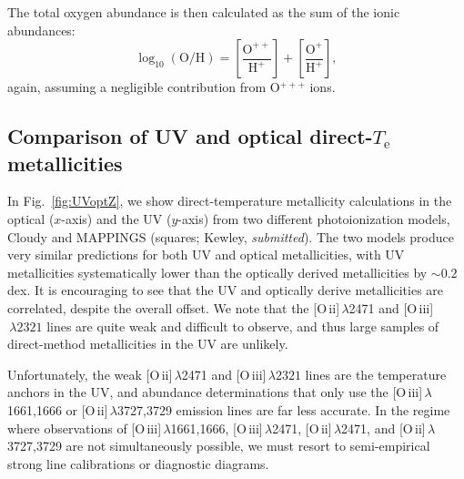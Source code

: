 \documentclass[preprint2]{aastex62}
\newcommand{\oiii}{[O\,{\sc iii}]\xspace}
\newcommand{\oii}{[O\,{\sc ii}]\xspace}
\newcommand{\Te}{\ensuremath{T_{\mathrm{e}}}\xspace}
\begin{document}
The total oxygen abundance is then calculated as the sum of the ionic abundances:
\begin{equation}
    \log_{10}(\mathrm{O}/\mathrm{H}) = \left[ \frac{\mathrm{O}^{++}}{\mathrm{H}^{+}} \right] + \left[ \frac{\mathrm{O}^{+}}{\mathrm{H}^{+}} \right],
\end{equation}
again, assuming a negligible contribution from O$^{+++}$ ions.

\subsection{Comparison of UV and optical direct-\Te metallicities}

In Fig.~\ref{fig:UVoptZ}, we show direct-temperature metallicity calculations in the optical ($x$-axis) and the UV ($y$-axis) from two different photoionization models, Cloudy \citep[circles;][]{Byler+2018} and MAPPINGS (squares; Kewley, \emph{submitted}). The two models produce very similar predictions for both UV and optical metallicities, with UV metallicities systematically lower than the optically derived metallicities by $\sim0.2$\,dex. It is encouraging to see that the UV and optically derive metallicities are correlated, despite the overall offset. We note that the \oii$\,\lambda$2471 and \oiii$\,\lambda2321$ lines are quite weak and difficult to observe, and thus large samples of direct-method metallicities in the UV are unlikely.

Unfortunately, the weak \oii$\,\lambda$2471 and \oiii$\,\lambda2321$ lines are the temperature anchors in the UV, and abundance determinations that only use the \oiii$\,\lambda$1661,1666 or \oii$\,\lambda$3727,3729 emission lines are far less accurate. In the regime where observations of  \oiii$\,\lambda$1661,1666, \oiii$\,\lambda$2471, \oii$\,\lambda$2471, and \oii$\,\lambda$3727,3729 are not simultaneously possible, we must resort to semi-empirical strong line calibrations or diagnostic diagrams.
\end{document}
